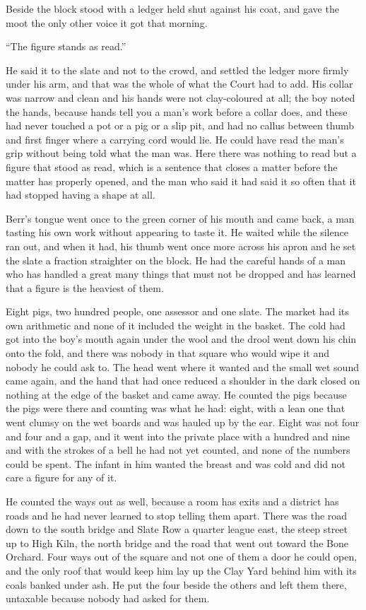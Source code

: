 Beside the block  stood with a ledger held shut against his coat, and gave the moot the only other voice it got that morning.

“The figure stands as read.”

He said it to the slate and not to the crowd, and settled the ledger more firmly under his arm, and that was the whole of what the Court had to add. His collar was narrow and clean and his hands were not clay-coloured at all; the boy noted the hands, because hands tell you a man's work before a collar does, and these had never touched a pot or a pig or a slip pit, and had no callus between thumb and first finger where a carrying cord would lie. He could have read the man's grip without being told what the man was. Here there was nothing to read but a figure that stood as read, which is a sentence that closes a matter before the matter has properly opened, and the man who said it had said it so often that it had stopped having a shape at all.

Berr's tongue went once to the green corner of his mouth and came back, a man tasting his own work without appearing to taste it. He waited while the silence ran out, and when it had, his thumb went once more across his apron and he set the slate a fraction straighter on the block. He had the careful hands of a man who has handled a great many things that must not be dropped and has learned that a figure is the heaviest of them.

Eight pigs, two hundred people, one assessor and one slate. The market had its own arithmetic and none of it included the weight in the basket. The cold had got into the boy's mouth again under the wool and the drool went down his chin onto the fold, and there was nobody in that square who would wipe it and nobody he could ask to. The head went where it wanted and the small wet sound came again, and the hand that had once reduced a shoulder in the dark closed on nothing at the edge of the basket and came away. He counted the pigs because the pigs were there and counting was what he had: eight, with a lean one that went clumsy on the wet boards and was hauled up by the ear. Eight was not four and four and a gap, and it went into the private place with a hundred and nine and with the strokes of a bell he had not yet counted, and none of the numbers could be spent. The infant in him wanted the breast and was cold and did not care a figure for any of it.

He counted the ways out as well, because a room has exits and a district has roads and he had never learned to stop telling them apart. There was the road down to the south bridge and Slate Row a quarter league east, the steep street up to High Kiln, the north bridge and the road that went out toward the Bone Orchard. Four ways out of the square and not one of them a door he could open, and the only roof that would keep him lay up the Clay Yard behind him with its coals banked under ash. He put the four beside the others and left them there, untaxable because nobody had asked for them.

